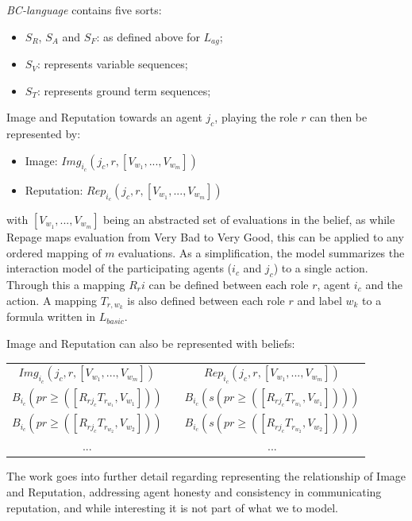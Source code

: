 \textit{\textit{BC}-language} contains five sorts:
\begin{itemize}
	\item $S_R$, $S_A$ and $S_F$: as defined above for $L_{ag}$;
	\item $S_V$: represents variable sequences;
	\item $S_T$: represents ground term sequences;
\end{itemize}

Image and Reputation towards an agent $j_c$, playing the role $r$ can then be represented by:
\begin{itemize}
	\item Image: $Img_{i_c} (j_c, r, [V_{w_1}, ..., V_{w_m}])$
	\item Reputation: $Rep_{i_c} (j_c, r, [V_{w_1}, ..., V_{w_m}])$
\end{itemize}
with $[V_{w_1}, ..., V_{w_m}]$ being an abstracted set of evaluations in the belief, as while Repage maps evaluation from Very Bad to Very Good, this can be applied to any ordered mapping of $m$ evaluations. As a simplification, the model summarizes the interaction model of the participating agents ($i_c$ and $j_c$) to a single action. Through this a mapping $R_ri$ can be defined between each role $r$, agent $i_c$ and the action. A mapping $T_{r, w_k}$ is also defined between each role $r$ and label $w_k$ to a formula written in $L_{basic}$.

Image and Reputation can also be represented with beliefs:

\begin{table}[]
	\centering
	\begin{tabular}{ccc}
		$Img_{i_c}(j_c, r, [V_{w_1}, ..., V_{w_m}])$  & & $Rep_{i_c} (j_c, r, [V_{w_1}, ..., V_{w_m}])$\\ \cline{1-1} \cline{3-3} 
		$B_{i_c} (pr\geq([R_{rj_c} T_{r_{w_1}}, V_{w_1}]))$ & & $B_{i_c} (s(pr\geq([R_{rj_c} T_{r_{w_1}}, V_{w_1}])))$ \\
		$B_{i_c} (pr\geq([R_{rj_c} T_{r_{w_2}}, V_{w_2}]))$ & & $B_{i_c} (s(pr\geq([R_{rj_c} T_{r_{w_2}}, V_{w_2}])))$ \\
		... & & ...
	\end{tabular}
\end{table}
The work goes into further detail regarding representing the relationship of Image and Reputation, addressing agent honesty and consistency in communicating reputation, and while interesting it is not part of what we to model.

